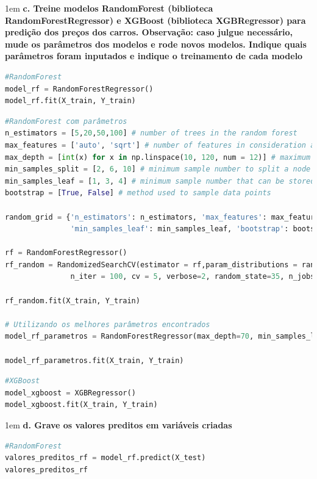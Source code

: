 \begin{adjustwidth}{1em}{}
\textbf{c. Treine modelos RandomForest (biblioteca RandomForestRegressor) e XGBoost (biblioteca XGBRegressor) para predição
dos preços dos carros. \textbf{Observação}: caso julgue necessário, mude os parâmetros dos modelos e rode novos
modelos. Indique quais parâmetros foram inputados e indique o treinamento de cada modelo}
\end{adjustwidth}
\begin{lstlisting}[language=Python, style=input]
#RandomForest
model_rf = RandomForestRegressor()
model_rf.fit(X_train, Y_train)
\end{lstlisting}

\begin{lstlisting}[language=Python, style=input]
#RandomForest com parâmetros
n_estimators = [5,20,50,100] # number of trees in the random forest
max_features = ['auto', 'sqrt'] # number of features in consideration at every split
max_depth = [int(x) for x in np.linspace(10, 120, num = 12)] # maximum number of levels allowed in each decision tree
min_samples_split = [2, 6, 10] # minimum sample number to split a node
min_samples_leaf = [1, 3, 4] # minimum sample number that can be stored in a leaf node
bootstrap = [True, False] # method used to sample data points

random_grid = {'n_estimators': n_estimators, 'max_features': max_features, 'max_depth': max_depth, 'min_samples_split': min_samples_split, 
               'min_samples_leaf': min_samples_leaf, 'bootstrap': bootstrap}

rf = RandomForestRegressor()
rf_random = RandomizedSearchCV(estimator = rf,param_distributions = random_grid,
               n_iter = 100, cv = 5, verbose=2, random_state=35, n_jobs = -1)

rf_random.fit(X_train, Y_train)

# Utilizando os melhores parâmetros encontrados
model_rf_parametros = RandomForestRegressor(max_depth=70, min_samples_leaf=1, min_samples_split=2, n_estimators=20, random_state=80)

model_rf_parametros.fit(X_train, Y_train)
\end{lstlisting}

\begin{lstlisting}[language=Python, style=input]
#XGBoost
model_xgboost = XGBRegressor()
model_xgboost.fit(X_train, Y_train)
\end{lstlisting}


\begin{adjustwidth}{1em}{}
\textbf{d. Grave os valores preditos em variáveis criadas}
\end{adjustwidth}
\begin{lstlisting}[language=Python, style=input]
#RandomForest
valores_preditos_rf = model_rf.predict(X_test)
valores_preditos_rf 
\end{lstlisting}

